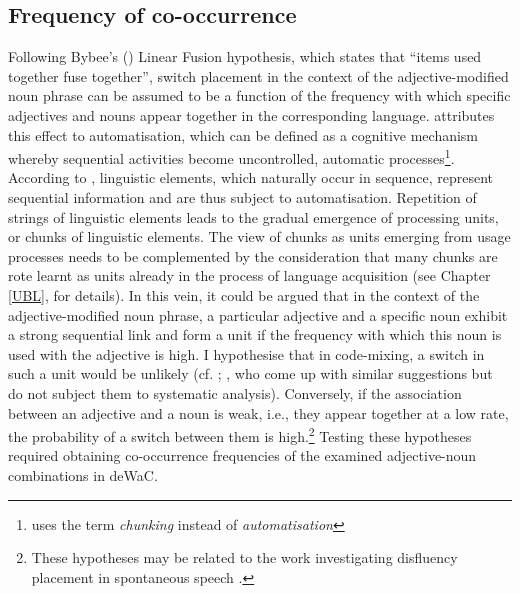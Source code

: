 \subsection{Frequency of co-occurrence}
Following Bybee's (\citeyear[112]{bybee-constituency-2002}) Linear Fusion hypothesis, which states that ``items used together fuse together'', switch placement in the context of the adjective-modified noun phrase can be assumed to be a function of the frequency with which specific adjectives and nouns appear together in the corresponding language. \citet{diessel-toappear} attributes this effect to automatisation, which can be defined as a cognitive mechanism whereby sequential activities become uncontrolled, automatic processes\footnote{\citet{bybee-book-2010} uses the term \textit{chunking} instead of \textit{automatisation}}. According to \citet{diessel-toappear}, linguistic elements, which naturally occur in sequence, represent sequential information and are thus subject to automatisation. Repetition of strings of linguistic elements leads to the gradual emergence of processing units, or chunks of linguistic elements.  The view of chunks as units emerging from usage processes needs to be complemented by the consideration that many chunks are rote learnt as units already in the process of language acquisition (see Chapter \ref{UBL}, for details). In this vein, it could be argued that in the context of the adjective-modified noun phrase, a particular adjective and a specific noun exhibit a strong sequential link and form a unit if the frequency with which this noun is used with the adjective is high. I hypothesise that in code-mixing, a switch in such a unit would be unlikely (cf. \cite[125--131]{backus-two-1996}; \cite[386]{boumans-syntax-1998}, who come up with similar suggestions but do not subject them to systematic analysis). Conversely, if the association between an adjective and a noun is weak, i.e., they appear together at a low rate, the probability of a switch between them is high.\footnote{These hypotheses may be related to the work investigating disfluency placement in spontaneous speech \citep[e.g.,][]{schneider2014}.} Testing these hypotheses required obtaining co-occurrence frequencies of the examined adjective-noun combinations in deWaC. 

